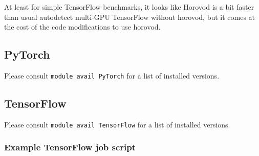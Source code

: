 At least for simple TensorFlow benchmarks, it looks like Horovod is a bit faster than usual autodetect multi-GPU TensorFlow without horovod, but it comes at the
cost of the code modifications to use horovod.







\subsection{PyTorch}
\label{sec:gpu_ugent_software_pytorch}

Please consult \lstinline|module avail PyTorch| for a list of installed versions.





\subsection{TensorFlow}
\label{sec:gpu_ugent_software_tensorflow}

Please consult \lstinline|module avail TensorFlow| for a list of installed versions.


\subsubsection{Example TensorFlow job script}
\label{sec:gpu_ugent_software_tensorflow_example_job_script}



